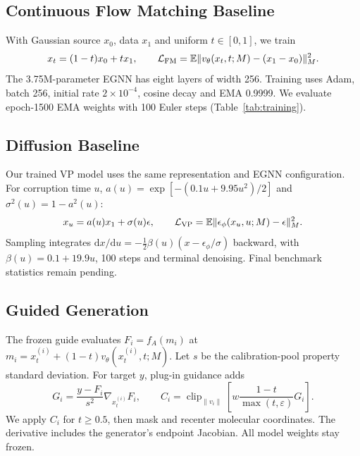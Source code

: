 \documentclass{article}
\begin{document}
\subsection{Continuous Flow Matching Baseline}\label{sec:fm}
With Gaussian source $x_0$, data $x_1$ and uniform $t\in[0,1]$, we train
\begin{equation}
x_t=(1-t)x_0+tx_1,\qquad \mathcal L_{\rm FM}=\mathbb E\|v_\theta(x_t,t;M)-(x_1-x_0)\|_M^2.
\label{eq:fm}
\end{equation}
The 3.75M-parameter EGNN has eight layers of width 256. Training uses Adam, batch 256, initial rate $2\times10^{-4}$, cosine decay and EMA 0.9999. We evaluate epoch-1500 EMA weights with 100 Euler steps (Table~\ref{tab:training}).

\subsection{Diffusion Baseline}\label{sec:diff}
Our trained VP model uses the same representation and EGNN configuration. For corruption time $u$, $a(u)=\exp[-(0.1u+9.95u^2)/2]$ and $\sigma^2(u)=1-a^2(u)$:
\begin{equation}
x_u=a(u)x_1+\sigma(u)\epsilon,\qquad\mathcal L_{\rm VP}=\mathbb E\|\epsilon_\phi(x_u,u;M)-\epsilon\|_M^2.
\label{eq:vp}
\end{equation}
Sampling integrates $\mathrm dx/\mathrm du=-\frac12\beta(u)(x-\epsilon_\phi/\sigma)$ backward, with $\beta(u)=0.1+19.9u$, 100 steps and terminal denoising. Final benchmark statistics remain pending.

\subsection{Guided Generation}\label{sec:guidance}
The frozen guide evaluates $F_i=f_A(m_i)$ at $m_i=x_t^{(i)}+(1-t)v_\theta(x_t^{(i)},t;M)$. Let $s$ be the calibration-pool property standard deviation. For target $y$, plug-in guidance adds
\begin{equation}
G_i=\frac{y-F_i}{s^2}\nabla_{x_t^{(i)}}F_i,\qquad
C_i=\operatorname{clip}_{\|v_i\|}\!\left[w\frac{1-t}{\max(t,\varepsilon)}G_i\right].
\label{eq:plug}
\end{equation}
We apply $C_i$ for $t\ge0.5$, then mask and recenter molecular coordinates. The derivative includes the generator's endpoint Jacobian. All model weights stay frozen.
\end{document}
